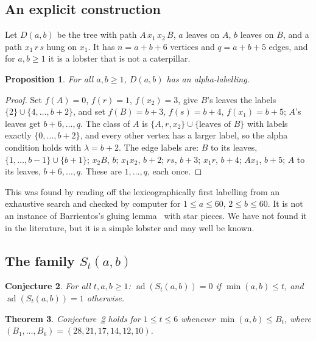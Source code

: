 \documentclass[11pt]{amsart}
\newtheorem{theorem}{Theorem}
\newtheorem{proposition}[theorem]{Proposition}
\newtheorem{conjecture}[theorem]{Conjecture}
\theoremstyle{definition}
\newcommand{\ad}{\operatorname{ad}}
\begin{document}
\subsection{An explicit construction}

Let $D(a,b)$ be the tree with path $A\,x_1\,x_2\,B$, $a$ leaves on $A$, $b$ leaves on $B$, and a path $x_1\,r\,s$
hung on $x_1$. It has $n=a+b+6$ vertices and $q=a+b+5$ edges, and for $a,b\ge 1$ it is a lobster that is not a
caterpillar.

\begin{proposition}\label{prop:formula}
For all $a,b\ge 1$, $D(a,b)$ has an alpha-labelling.
\end{proposition}

\begin{proof}
Set $f(A)=0$, $f(r)=1$, $f(x_2)=3$, give $B$'s leaves the labels $\{2\}\cup\{4,\dots,b+2\}$, and set
$f(B)=b+3$, $f(s)=b+4$, $f(x_1)=b+5$; $A$'s leaves get $b+6,\dots,q$. The class of $A$ is
$\{A,r,x_2\}\cup\{\text{leaves of }B\}$ with labels exactly $\{0,\dots,b+2\}$, and every other vertex has a
larger label, so the alpha condition holds with $\lambda=b+2$. The edge labels are: $B$ to its leaves,
$\{1,\dots,b-1\}\cup\{b+1\}$; $x_2B$, $b$; $x_1x_2$, $b+2$; $rs$, $b+3$; $x_1r$, $b+4$; $Ax_1$, $b+5$; $A$ to its
leaves, $b+6,\dots,q$. These are $1,\dots,q$, each once.
\end{proof}

This was found by reading off the lexicographically first labelling from an exhaustive search and checked by
computer for $1\le a\le 60$, $2\le b\le 60$. It is not an instance of Barrientos's gluing lemma~\cite{barrientos}
with star pieces. We have not found it in the literature, but it is a simple lobster and may well be known.

\subsection{The family $S_t(a,b)$}

\begin{conjecture}\label{conj:1}
For all $t,a,b\ge 1$: $\ad(S_t(a,b))=0$ if $\min(a,b)\le t$, and $\ad(S_t(a,b))=1$ otherwise.
\end{conjecture}

\begin{theorem}\label{thm:conj1}
Conjecture~\ref{conj:1} holds for $1\le t\le 6$ whenever $\min(a,b)\le B_t$, where
$(B_1,\dots,B_6)=(28,21,17,14,12,10)$.
\end{theorem}
\end{document}
